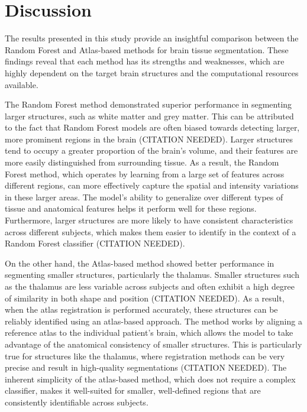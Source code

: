 \section{Discussion}
The results presented in this study provide an insightful comparison between the Random Forest and Atlas-based methods for brain tissue segmentation. These findings reveal that each method has its strengths and weaknesses, which are highly dependent on the target brain structures and the computational resources available.

The Random Forest method demonstrated superior performance in segmenting larger structures, such as white matter and grey matter. This can be attributed to the fact that Random Forest models are often biased towards detecting larger, more prominent regions in the brain (CITATION NEEDED). Larger structures tend to occupy a greater proportion of the brain’s volume, and their features are more easily distinguished from surrounding tissue. As a result, the Random Forest method, which operates by learning from a large set of features across different regions, can more effectively capture the spatial and intensity variations in these larger areas. The model's ability to generalize over different types of tissue and anatomical features helps it perform well for these regions. Furthermore, larger structures are more likely to have consistent characteristics across different subjects, which makes them easier to identify in the context of a Random Forest classifier (CITATION NEEDED).

On the other hand, the Atlas-based method showed better performance in segmenting smaller structures, particularly the thalamus. Smaller structures such as the thalamus are less variable across subjects and often exhibit a high degree of similarity in both shape and position (CITATION NEEDED). As a result, when the atlas registration is performed accurately, these structures can be reliably identified using an atlas-based approach. The method works by aligning a reference atlas to the individual patient's brain, which allows the model to take advantage of the anatomical consistency of smaller structures. This is particularly true for structures like the thalamus, where registration methods can be very precise and result in high-quality segmentations (CITATION NEEDED). The inherent simplicity of the atlas-based method, which does not require a complex classifier, makes it well-suited for smaller, well-defined regions that are consistently identifiable across subjects.

